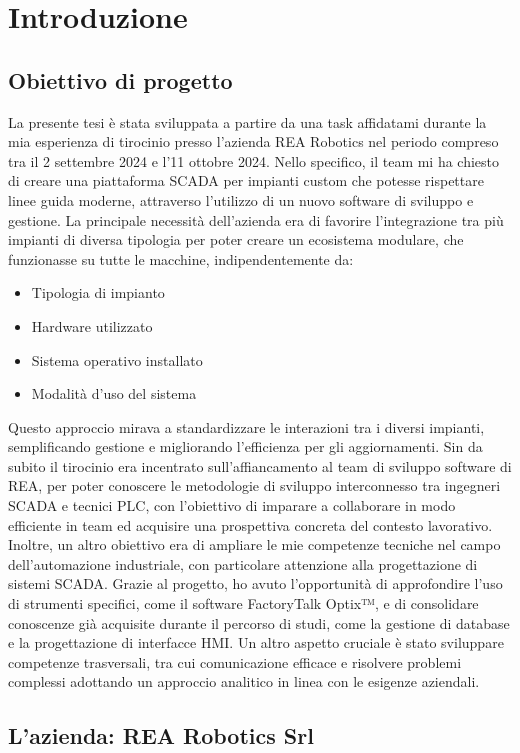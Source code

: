 \chapter{Introduzione}

\section{Obiettivo di progetto} 
La presente tesi è stata sviluppata a partire da una task affidatami durante la mia esperienza di tirocinio presso l'azienda REA Robotics nel periodo compreso tra il 2 settembre 2024 e l'11 ottobre 2024. Nello specifico, il team mi ha chiesto di creare una piattaforma SCADA per impianti custom che potesse rispettare linee guida moderne, attraverso l'utilizzo di un nuovo software di sviluppo e gestione. La principale necessità dell'azienda era di favorire l'integrazione tra più impianti di diversa tipologia per poter creare un ecosistema modulare, che funzionasse su tutte le macchine, indipendentemente da:
\begin{itemize}
    \item Tipologia di impianto
    \item Hardware utilizzato
    \item Sistema operativo installato
    \item Modalità d'uso del sistema
\end{itemize}
Questo approccio mirava a standardizzare le interazioni tra i diversi impianti, semplificando gestione e migliorando l'efficienza per gli aggiornamenti. Sin da subito il tirocinio era incentrato sull'affiancamento al team di sviluppo software di REA, per poter conoscere le metodologie di sviluppo interconnesso tra ingegneri SCADA e tecnici PLC, con l'obiettivo di imparare a collaborare in modo efficiente in team ed acquisire una prospettiva concreta del contesto lavorativo. Inoltre, un altro obiettivo era di ampliare le mie competenze tecniche nel campo dell'automazione industriale, con particolare attenzione alla progettazione di sistemi SCADA. Grazie al progetto, ho avuto l'opportunità di approfondire l'uso di strumenti specifici, come il software FactoryTalk Optix™, e di consolidare conoscenze già acquisite durante il percorso di studi, come la gestione di database e la progettazione di interfacce HMI. Un altro aspetto cruciale è stato sviluppare competenze trasversali, tra cui comunicazione efficace e risolvere problemi complessi adottando un approccio analitico in linea con le esigenze aziendali.

\section{L'azienda: REA Robotics Srl}

